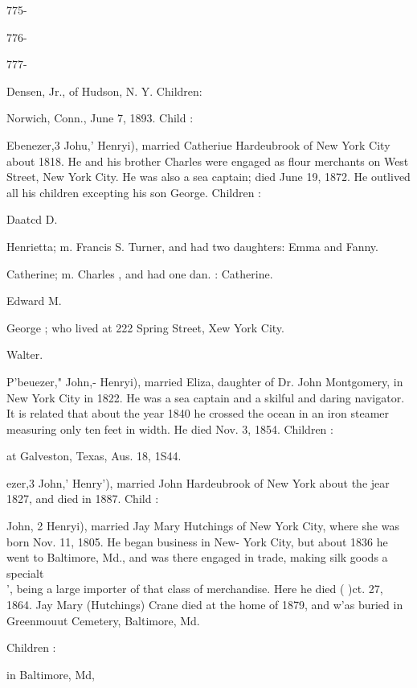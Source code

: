 \documentclass{book}
\begin{document}
775- 




776- 




777- 









Densen, Jr., of Hudson, N. Y. Children: 




Norwich, Conn., June 7, 1893. Child : 

Ebenezer,3 Johu,' Henryi), married Catheriue Hardeubrook of 
New York City about 1818. He and his brother Charles were 
engaged as flour merchants on West Street, New York City. He 
was also a sea captain; died June 19, 1872. He outlived all his 
children excepting his son George. Children : 

Daatcd D. 

Henrietta; m. Francis S. Turner, and had two daughters: 
Emma and Fanny. 

Catherine; m. Charles , and had one dan. : Catherine. 

Edward M. 

George ; who lived at 222 Spring Street, Xew York City. 

Walter. 

P'beuezer," John,- Henryi), married Eliza, daughter of Dr. John 
Montgomery, in New York City in 1822. He was a sea captain 
and a skilful and daring navigator. It is related that about the 
year 1840 he crossed the ocean in an iron steamer measuring only 
ten feet in width. He died Nov. 3, 1854. Children : 



at Galveston, Texas, Aus. 18, 1S44. 

ezer,3 John,' Henry'), married John Hardeubrook of New York 
about the jear 1827, and died in 1887. Child : 


John, 2 Henryi), married Jay Mary Hutchings of New York City, 
where she was born Nov. 11, 1805. He began business in New- 
York City, but about 1836 he went to Baltimore, Md., and was 
there engaged in trade, making silk goods a specialt\\', being a 
large importer of that class of merchandise. Here he died ( )ct. 
27, 1864. Jay Mary (Hutchings) Crane died at the home of 
1879, and w'as buried in Greenmouut Cemetery, Baltimore, Md. 

Children : 

in Baltimore, Md, 
\end{document}
